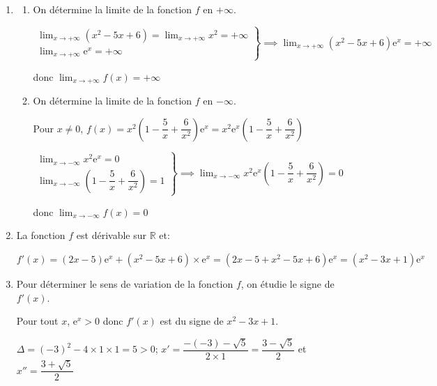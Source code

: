 \documentclass[10pt]{article}
\providecommand{\R}{\mathbb{R}}
\providecommand{\e}{{\mathrm{e}}}
\providecommand{\ds}{\displaystyle}
\begin{document}
\begin{enumerate}
\item 
	\begin{enumerate}
		\item On détermine la limite de la fonction $f$ en $+\infty$.
		
$\left .
\begin{array}{l}
\ds\lim_{x\to +\infty} \left (x^2-5x+6\right ) = \ds\lim_{x\to +\infty} x^2 = +\infty\\
\ds\lim_{x\to +\infty} \e^{x} = +\infty
\end{array}
\right \}		
\implies
\ds\lim_{x\to +\infty} \left (x^2-5x+6\right )\e^{x} = +\infty$

donc
$\ds\lim_{x\to +\infty} f(x)=+\infty$		
		
		\item On détermine la limite de la fonction $f$ en $-\infty$.
		
Pour $x\neq 0$, $f(x)=x^2\left (1-\dfrac{5}{x} +\dfrac{6}{x^2}\right )\e^{x}	
= x^2\e^{x}\left (1-\dfrac{5}{x} +\dfrac{6}{x^2}\right )$

$\left .
\begin{array}{l}
\ds\lim_{x\to -\infty} x^2 \e^{x} = 0\\
\ds\lim_{x\to -\infty} \left (1-\dfrac{5}{x} +\dfrac{6}{x^2}\right )=1
\end{array}
\right \}		
\implies
\ds\lim_{x\to -\infty} x^2\e^{x}\left (1-\dfrac{5}{x} +\dfrac{6}{x^2}\right ) = 0$

donc
$\ds\lim_{x\to -\infty} f(x)=0$
		
	\end{enumerate}
\item 
La fonction $f$ est dérivable sur $\R$ et:

$f'(x)=\left (2x-5\right )\e^{x} + \left (x^2-5x+6\right )\times \e^{x}
= \left ( 2x-5+x^2-5x+6\right )\e^{x}
= \left (x^2-3x+1\right )\e^{x}$


\item Pour déterminer le sens de variation de la fonction $f$, on étudie le signe de $f'(x)$.

Pour tout $x$, $\e^{x}>0$ donc $f'(x)$ est du signe de $x^2-3x+1$.

$\Delta=(-3)^2-4\times 1 \times 1 = 5>0$;
$x'=\dfrac{-(-3)-\sqrt{5}}{2\times 1} = \dfrac{3-\sqrt{5}}{2}$
et $x''=\dfrac{3+\sqrt{5}}{2}$


\end{enumerate}
\end{document}
